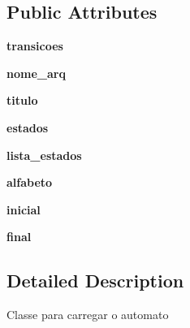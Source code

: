 \subsection*{Public Attributes}
\begin{DoxyCompactItemize}
\item 
{\bfseries transicoes}\hypertarget{classafn2afd_1_1AFN_afd27557b2679fcd7b70a34ffab9b8125}{}\label{classafn2afd_1_1AFN_afd27557b2679fcd7b70a34ffab9b8125}

\item 
{\bfseries nome\+\_\+arq}\hypertarget{classafn2afd_1_1AFN_ac80c82294f4ddea69e2d55ec718d8068}{}\label{classafn2afd_1_1AFN_ac80c82294f4ddea69e2d55ec718d8068}

\item 
{\bfseries titulo}\hypertarget{classafn2afd_1_1AFN_a24dda968e5f39e7e313a8362e7f6e72d}{}\label{classafn2afd_1_1AFN_a24dda968e5f39e7e313a8362e7f6e72d}

\item 
{\bfseries estados}\hypertarget{classafn2afd_1_1AFN_afecc4daf07fb5397953453ee04bb6dc9}{}\label{classafn2afd_1_1AFN_afecc4daf07fb5397953453ee04bb6dc9}

\item 
{\bfseries lista\+\_\+estados}\hypertarget{classafn2afd_1_1AFN_a18f107be21969ce2c5cfee2ed8ae809a}{}\label{classafn2afd_1_1AFN_a18f107be21969ce2c5cfee2ed8ae809a}

\item 
{\bfseries alfabeto}\hypertarget{classafn2afd_1_1AFN_add812dc245d888b5fb2b352b5d974035}{}\label{classafn2afd_1_1AFN_add812dc245d888b5fb2b352b5d974035}

\item 
{\bfseries inicial}\hypertarget{classafn2afd_1_1AFN_a341a46438a8bbb71901d6ce098f2874f}{}\label{classafn2afd_1_1AFN_a341a46438a8bbb71901d6ce098f2874f}

\item 
{\bfseries final}\hypertarget{classafn2afd_1_1AFN_a051a8d74029b264d7ac51f2350e951e4}{}\label{classafn2afd_1_1AFN_a051a8d74029b264d7ac51f2350e951e4}

\end{DoxyCompactItemize}


\subsection{Detailed Description}
\begin{DoxyVerb}Classe para carregar o automato \end{DoxyVerb}
 

